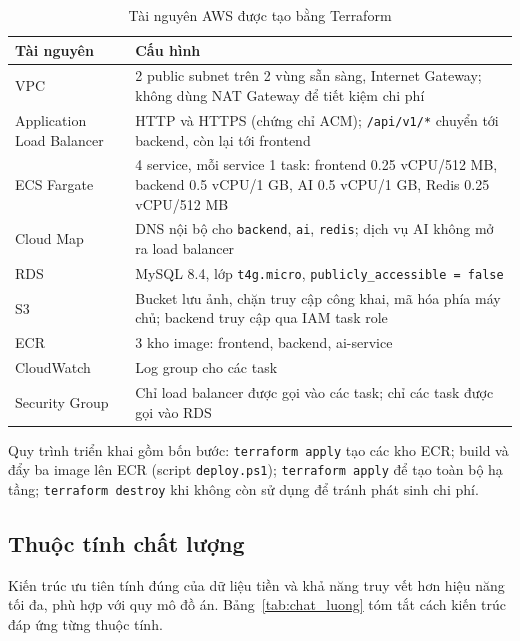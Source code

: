 \begin{table}[htbp]
    \centering
    \small
    \caption{Tài nguyên AWS được tạo bằng Terraform}
    \label{tab:aws}
    \begin{tabularx}{\textwidth}{|P{3.6cm}|X|}
        \hline
        \textbf{Tài nguyên} & \textbf{Cấu hình} \\
        \hline
        VPC & 2 public subnet trên 2 vùng sẵn sàng, Internet Gateway; không dùng NAT Gateway để tiết kiệm chi phí \\
        \hline
        Application Load Balancer & HTTP và HTTPS (chứng chỉ ACM); \texttt{/api/v1/*} chuyển tới backend, còn lại tới frontend \\
        \hline
        ECS Fargate & 4 service, mỗi service 1 task: frontend 0.25 vCPU/512 MB, backend 0.5 vCPU/1 GB, AI 0.5 vCPU/1 GB, Redis 0.25 vCPU/512 MB \\
        \hline
        Cloud Map & DNS nội bộ cho \texttt{backend}, \texttt{ai}, \texttt{redis}; dịch vụ AI không mở ra load balancer \\
        \hline
        RDS & MySQL 8.4, lớp \texttt{t4g.micro}, \texttt{publicly\_accessible = false} \\
        \hline
        S3 & Bucket lưu ảnh, chặn truy cập công khai, mã hóa phía máy chủ; backend truy cập qua IAM task role \\
        \hline
        ECR & 3 kho image: frontend, backend, ai-service \\
        \hline
        CloudWatch & Log group cho các task \\
        \hline
        Security Group & Chỉ load balancer được gọi vào các task; chỉ các task được gọi vào RDS \\
        \hline
    \end{tabularx}
\end{table}

Quy trình triển khai gồm bốn bước: \texttt{terraform apply} tạo các kho ECR; build và đẩy ba image lên ECR (script \texttt{deploy.ps1}); \texttt{terraform apply} để tạo toàn bộ hạ tầng; \texttt{terraform destroy} khi không còn sử dụng để tránh phát sinh chi phí.

\subsection{Thuộc tính chất lượng}

Kiến trúc ưu tiên tính đúng của dữ liệu tiền và khả năng truy vết hơn hiệu năng tối đa, phù hợp với quy mô đồ án. Bảng~\ref{tab:chat_luong} tóm tắt cách kiến trúc đáp ứng từng thuộc tính.

